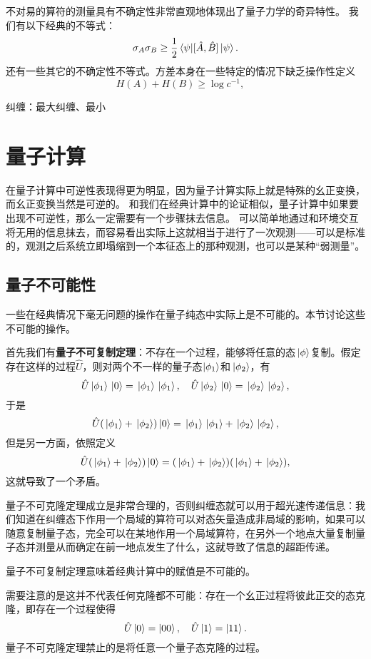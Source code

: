 \documentclass[UTF8, a4paper]{ctexart}
\begin{document}
不对易的算符的测量具有不确定性非常直观地体现出了量子力学的奇异特性。
我们有以下经典的不等式：
\begin{equation}
    \sigma_{A} \sigma_{B} \geq \frac{1}{2} \mel{\psi}{\comm*{\hat{A}}{\hat{B}}}{\psi}.
\end{equation}
还有一些其它的不确定性不等式。方差本身在一些特定的情况下缺乏操作性定义
\begin{equation}
    H(A) + H(B) \geq \log c^{-1}, \quad 
\end{equation}

纠缠：最大纠缠、最小

\section{量子计算}

在量子计算中可逆性表现得更为明显，因为量子计算实际上就是特殊的幺正变换，而幺正变换当然是可逆的。
和我们在经典计算中的论证相似，量子计算中如果要出现不可逆性，那么一定需要有一个步骤抹去信息。
可以简单地通过和环境交互将无用的信息抹去，而容易看出实际上这就相当于进行了一次观测——可以是标准的，观测之后系统立即塌缩到一个本征态上的那种观测，也可以是某种“弱测量”。

\subsection{量子不可能性}

一些在经典情况下毫无问题的操作在量子纯态中实际上是不可能的。本节讨论这些不可能的操作。

首先我们有\textbf{量子不可复制定理}：不存在一个过程，能够将任意的态$\ket*{\phi}$复制。假定存在这样的过程$\hat{U}$，则对两个不一样的量子态$\ket{\phi_1}$和$\ket*{\phi_2}$，有
\[
    \hat{U} \ket*{\phi_1} \ket*{0} = \ket*{\phi_1} \ket*{\phi_1}, \quad \hat{U} \ket*{\phi_2} \ket*{0} = \ket*{\phi_2} \ket*{\phi_2} ,
\]
于是
\[
    \hat{U} (\ket*{\phi_1} + \ket*{\phi_2}) \ket*{0} = \ket*{\phi_1} \ket*{\phi_1} + \ket*{\phi_2} \ket*{\phi_2},
\]
但是另一方面，依照定义
\[
    \hat{U} (\ket*{\phi_1} + \ket*{\phi_2}) \ket*{0} = (\ket*{\phi_1} + \ket*{\phi_2}) (\ket*{\phi_1} + \ket*{\phi_2}),
\]
这就导致了一个矛盾。

量子不可克隆定理成立是非常合理的，否则纠缠态就可以用于超光速传递信息：我们知道在纠缠态下作用一个局域的算符可以对态矢量造成非局域的影响，如果可以随意复制量子态，完全可以在某地作用一个局域算符，在另外一个地点大量复制量子态并测量从而确定在前一地点发生了什么，这就导致了信息的超距传递。

量子不可复制定理意味着经典计算中的赋值是不可能的。

需要注意的是这并不代表任何克隆都不可能：存在一个幺正过程将彼此正交的态克隆，即存在一个过程使得
\[
    \hat{U} \ket{0} = \ket{00}, \quad \hat{U} \ket{1} = \ket{11}.
\]
量子不可克隆定理禁止的是将任意一个量子态克隆的过程。
\end{document}
